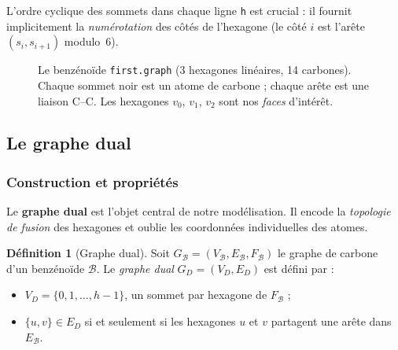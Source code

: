 \documentclass[12pt,a4paper]{article}
\theoremstyle{definition}
\newtheorem{definition}{D\'efinition}[section]
\theoremstyle{remark}
\newcommand{\B}{\mathcal{B}}
\newcommand{\GD}{G_{\!D}}
\newcommand{\GB}{G_{\!\B}}
\newcommand{\VD}{V_{\!D}}
\newcommand{\ED}{E_{\!D}}
\begin{document}
L'ordre cyclique des sommets dans chaque ligne \texttt{h} est crucial :
il fournit implicitement la \emph{num\'erotation} des c\^ot\'es de
l'hexagone (le c\^ot\'e $i$ est l'ar\^ete $(s_i, s_{i+1})$ modulo~6).

\begin{figure}[!ht]
\centering
{}
\caption{Le benz\'eno\"ide \texttt{first.graph} (3 hexagones lin\'eaires,
14 carbones). Chaque sommet noir est un atome de carbone ; chaque ar\^ete
est une liaison C--C. Les hexagones $v_0$, $v_1$, $v_2$ sont nos
\emph{faces} d'int\'er\^et.}
\label{fig:first-graph}
\end{figure}

\subsection{Le graphe dual}
\label{sec:dual}

\subsubsection{Construction et propri\'et\'es}

Le \textbf{graphe dual} est l'objet central de notre mod\'elisation. Il
encode la \emph{topologie de fusion} des hexagones et oublie les
coordonn\'ees individuelles des atomes.

\begin{definition}[Graphe dual]
\label{def:dual}
Soit $\GB = (V_\B, E_\B, F_\B)$ le graphe de carbone d'un benz\'eno\"ide
$\B$. Le \emph{graphe dual} $\GD = (\VD, \ED)$ est d\'efini par :
\begin{itemize}
  \item $\VD = \{0, 1, \ldots, h-1\}$, un sommet par hexagone de $F_\B$ ;
  \item $\{u, v\} \in \ED$ si et seulement si les hexagones $u$ et $v$
        partagent une ar\^ete dans $E_\B$.
\end{itemize}
\end{definition}
\end{document}
